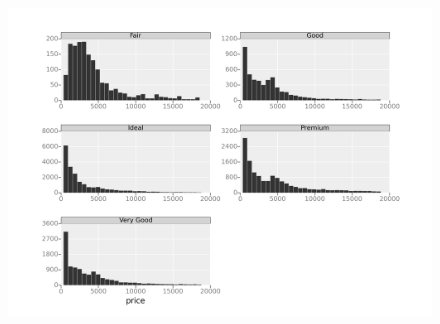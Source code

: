 \documentclass{beamer}
\begin{document}
\begin{frame}
	\begin{figure}
		\centering
		\includegraphics[width=1.1\linewidth]{FacetsB}
		\caption{}
		\label{fig:FacetsB}
	\end{figure}
	
\end{frame}
\end{document}
